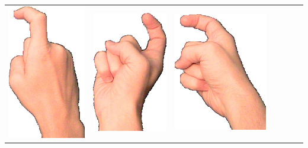 \documentclass{article}
\begin{document}
\begin{center}
\begin{tabular}{r*{6}{c}}
\includegraphics[scale=0.1]{images/01-05-3.jpg}&
\includegraphics[scale=0.1]{images/01-05-4.jpg}&
\includegraphics[scale=0.1]{images/01-05-5.jpg}&

\end{tabular}
\end{center}
\end{document}
